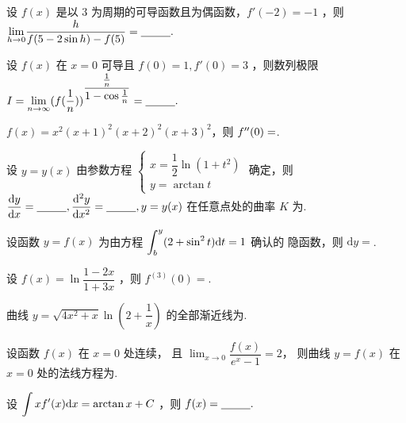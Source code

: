 \begin{quest}[660T29]
    设 $ f(x) $ 是以 $ 3 $ 为周期的可导函数且为偶函数，$ f'(-2) = -1 $ ，则
    $ {\displaystyle\lim_{h\rightarrow 0}}\dfrac{h}{f(5-2\sin h) - f(5)} = \underline{~~~~~~~~}. $ 
\end{quest}

\begin{quest}[660T30]
    设 $ f(x) $ 在 $ x= 0 $ 可导且 $ f(0) = 1,f'(0)=3 $ ，则数列极限\newline
    $
    \displaystyle I = {\displaystyle\lim_{n\rightarrow \infty}}
    (f(\dfrac{1}{n}))^{\dfrac{\frac{1}{n}}{1-\cos\frac{1}{n}}} =\underline{~~~~~~~~}.
    $
\end{quest}

\begin{quest}[660T33]
    $ f(x) = x^2(x+1)^2(x+2)^2(x+3)^2 $，则 $ f^{\prime\prime}(0) =$\qline. 
\end{quest}

\begin{quest}[660T34]
    设 $ y = y(x) $ 由参数方程 
    $ \begin{cases}
        x = \dfrac{1}{2}\ln (1+t^2)\\ y = \arctan t
    \end{cases} $ 确定，则 $ \dfrac{\mathrm{d}y}{\mathrm{d}x} = \underline{~~~~~~~~},
    \dfrac{\mathrm{d}^2y}{\mathrm{d}x^2}=\underline{~~~~~~~~},y = y(x) $ 在任意点处的曲率 $ K $ 为\qline.
\end{quest}

\begin{quest}[660T38]
    设函数 $ y=f(x) $ 为由方程 $ \displaystyle \int_b^y(2+\sin^2t)\mathrm{d}t = 1 $ 确认的
    隐函数，则 $ \mathrm{d}y =$\qline.
\end{quest}

\begin{quest}[660T40]
    设 $ f(x) =\ln \dfrac{1-2x}{1+3x} $ ，则 $ f^{(3)}(0) = $\qline. 
\end{quest}

\begin{quest}[660T48]
    曲线 $ y = \sqrt{4x^2+x}\ln (2+\dfrac{1}{x}) $ 的全部渐近线为\qline.
\end{quest}

\begin{quest}[660T49]
    设函数 $ f(x) $ 在 $ x = 0 $ 处连续，
    且 $ {\displaystyle\lim_{x\rightarrow 0}}\dfrac{f(x)}{e^x - 1} = 2 $，
    则曲线 $ y = f(x) $ 在 $ x = 0 $ 处的法线方程为\qline.
\end{quest}

\begin{quest}[660T51]
    设 $ \displaystyle \int xf'(x)\mathrm{d}x = \arctan x + C $ ，则 $ f(x) = \underline{~~~~~~~~}. $ 
\end{quest}

